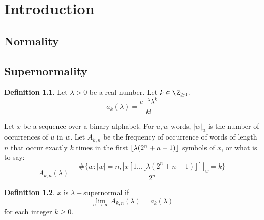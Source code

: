 \documentclass[11pt,a4paper,twoside]{tesis}
\theoremstyle{definition}
\newtheorem{definition}{Definition}[section]
\DeclarePairedDelimiter{\floor}{\lfloor}{\rfloor}
\begin{document}

\def\autor{Lucas Puterman}
\def\tituloTesis{Números Muy Normales}
\def\runtitulo{Números Muy Normales}
\def\runtitle{Very Normal Numbers}
\def\director{Verónica Becher}
\def\codirector{Olivier Carton}
\def\lugar{Buenos Aires, 2019}


\frontmatter
\pagestyle{empty}


\cleardoublepage



\cleardoublepage
\tableofcontents

\mainmatter
\pagestyle{headings}


\chapter{Introduction}
\section{Normality}
\section{Supernormality}

\begin{definition}
    Let $\lambda > 0$ be a real number. Let $k \in \Z_{\ge 0}$.
    $$a_k(\lambda) = \frac{e^{-\lambda}\lambda^k}{k!}$$
\end{definition}

Let $x$ be a sequence over a binary alphabet.
For $u,w$ words, $|w|_u$ is the number of occurrences of $u$ in $w$.
Let $A_{k,n}$ be the frequency of occurrence of words of length $n$ that occur exactly $k$ times in the first $\floor{\lambda(2^n+n-1)}$ symbols of $x$, or what is to say:
$$A_{k,n}(\lambda) = \frac{\#\{w: |w| = n  , |x[1...\lfloor\lambda(2^n+n-1)\rfloor]|_w = k\}}{2^n}$$

\begin{definition}
    $x$ is $\lambda-$supernormal if $$\lim_{n\to\infty} A_{k,n}(\lambda) = a_k(\lambda)$$ for each integer $k \geq 0$.
\end{definition}
\end{document}
